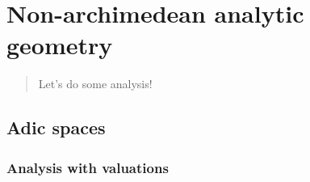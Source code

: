 \chapter{Non-archimedean analytic geometry} \label{chapter: valuations} 
    \begin{abstract}
        Let's do some analysis!
    \end{abstract}
    
    \minitoc
    
    
    
    \section{Adic spaces}
        \subsection{Analysis with valuations}
